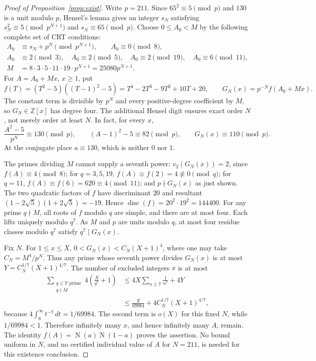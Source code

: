 \documentclass[11pt]{article}
\theoremstyle{plain}
\theoremstyle{definition}
\newcommand{\Norm}{\operatorname{N}}
\begin{document}
\begin{proof}[Proof of Proposition~\ref{prop:exist}]
Write $p=211$.  Since $65^2\equiv5\pmod p$ and $130$ is a unit modulo $p$,
Hensel's lemma gives an integer $s_N$ satisfying
$s_N^2\equiv5\pmod{p^{N+1}}$ and $s_N\equiv65\pmod p$.
Choose $0\le A_0<M$ by the following complete set of CRT conditions:
\[
 \begin{split}
 A_0&\equiv s_N+p^N\pmod{p^{N+1}},\qquad A_0\equiv0\pmod8,\\
 A_0&\equiv2\pmod3,\quad A_0\equiv2\pmod5,\quad
 A_0\equiv2\pmod{19},\quad A_0\equiv6\pmod{11},\\
 M&=8\cdot3\cdot5\cdot11\cdot19\cdot p^{N+1}
   =25080p^{N+1}.
 \end{split}
\]
For $A=A_0+Mx$, $x\ge1$, put
\[
 f(T)=(T^2-5)((T-1)^2-5)
     =T^4-2T^3-9T^2+10T+20,\qquad
 G_N(x)=p^{-N}f(A_0+Mx).
\]
The constant term is divisible by $p^N$ and every positive-degree
coefficient by $M$, so $G_N\in\mathbb Z[x]$ has degree four.
The additional Hensel digit ensures exact order $N$, not merely order at
least $N$.  In fact, for every $x$,
\[
 \frac{A^2-5}{p^N}\equiv130\pmod p,\qquad
 (A-1)^2-5\equiv82\pmod p,\qquad G_N(x)\equiv110\pmod p.
\]
At the conjugate place $a\equiv130$, which is neither $0$ nor $1$.

The primes dividing $M$ cannot supply a seventh power:
$v_2(G_N(x))=2$, since $f(A)\equiv4\pmod8$;
for $q=3,5,19$, $f(A)\equiv f(2)=4\not\equiv0\pmod q$;
for $q=11$, $f(A)\equiv f(6)=620\equiv4\pmod{11}$;
and $p\nmid G_N(x)$ as just shown.
The two quadratic factors of $f$ have discriminant $20$ and resultant
$(1-2\sqrt5)(1+2\sqrt5)=-19$.  Hence
$\operatorname{disc}(f)=20^2\cdot19^2=144400$.
For any prime $q\nmid M$, all roots of $f$ modulo $q$ are simple, and there
are at most four.  Each lifts uniquely modulo $q^7$.
As $M$ and $p$ are units modulo $q$, at most four residue classes modulo
$q^7$ satisfy $q^7\mid G_N(x)$.

Fix $N$.  For $1\le x\le X$,
$0<G_N(x)<C_N(X+1)^4$, where one may take $C_N=M^4/p^N$.
Thus any prime whose seventh power divides $G_N(x)$ is at most
$Y=C_N^{1/7}(X+1)^{4/7}$.
The number of excluded integers $x$ is at most
\[
 \begin{split}
 \sum_{\substack{q\le Y\text{ prime}\\q\nmid M}}
       4\left(\frac{X}{q^7}+1\right)
 &\le 4X\sum_{n\ge7}\frac1{n^7}+4Y\\
 &\le\frac{X}{69984}+4C_N^{1/7}(X+1)^{4/7},
 \end{split}
\]
because $4\int_6^\infty t^{-7}\,dt=1/69984$.
The second term is $o(X)$ for this fixed $N$, while $1/69984<1$.
Therefore infinitely many $x$, and hence infinitely many $A$, remain.
The identity $f(A)=\Norm(a)\Norm(1-a)$ proves the assertion.
No bound uniform in $N$, and no certified individual value of $A$ for
$N=211$, is needed for this existence conclusion.
\end{proof}
\end{document}
